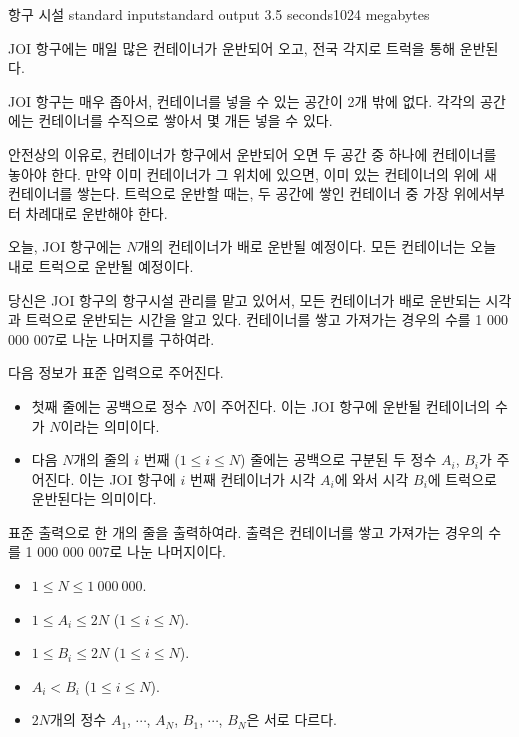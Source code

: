 \begin{problem}{항구 시설}
	{standard input}{standard output}
	{3.5 seconds}{1024 megabytes}{}
	
	JOI 항구에는 매일 많은 컨테이너가 운반되어 오고, 전국 각지로 트럭을 통해 운반된다.
	
	JOI 항구는 매우 좁아서, 컨테이너를 넣을 수 있는 공간이 2개 밖에 없다. 각각의 공간에는 컨테이너를 수직으로 쌓아서 몇 개든 넣을 수 있다.
	
	안전상의 이유로, 컨테이너가 항구에서 운반되어 오면 두 공간 중 하나에 컨테이너를 놓아야 한다. 만약 이미 컨테이너가 그 위치에 있으면, 이미 있는 컨테이너의 위에 새 컨테이너를 쌓는다. 트럭으로 운반할 때는, 두 공간에 쌓인 컨테이너 중 가장 위에서부터 차례대로 운반해야 한다.
	
	오늘, JOI 항구에는 $N$개의 컨테이너가 배로 운반될 예정이다. 모든 컨테이너는 오늘 내로 트럭으로 운반될 예정이다.
	
	당신은 JOI 항구의 항구시설 관리를 맡고 있어서, 모든 컨테이너가 배로 운반되는 시각과 트럭으로 운반되는 시간을 알고 있다. 컨테이너를 쌓고 가져가는 경우의 수를 1 000 000 007로 나눈 나머지를 구하여라.
	
	\InputFile

다음 정보가 표준 입력으로 주어진다.

\begin{itemize}
	\item 첫째 줄에는 공백으로 정수 $N$이 주어진다. 이는 JOI 항구에 운반될 컨테이너의 수가 $N$이라는 의미이다.
	\item 다음 $N$개의 줄의 $i$ 번째 ($1 \le i \le N$) 줄에는 공백으로 구분된 두 정수 $A_i$, $B_i$가 주어진다. 이는 JOI 항구에 $i$ 번째 컨테이너가 시각 $A_i$에 와서 시각 $B_i$에 트럭으로 운반된다는 의미이다.
\end{itemize}


\OutputFile

표준 출력으로 한 개의 줄을 출력하여라. 출력은 컨테이너를 쌓고 가져가는 경우의 수를 1 000 000 007로 나눈 나머지이다.

\Constraints

\begin{itemize}
	
	\item $1 \le N \le 1\ 000\ 000$.
	\item $1 \le A_i \le 2N$ ($1 \le i \le N$).
	\item $1 \le B_i \le 2N$ ($1 \le i \le N$).
	\item $A_i < B_i$ ($1 \le i \le N$).
	\item $2N$개의 정수 $A_1$, $\cdots$, $A_N$, $B_1$, $\cdots$, $B_N$은 서로 다르다.	
\end{itemize}



\end{problem}
